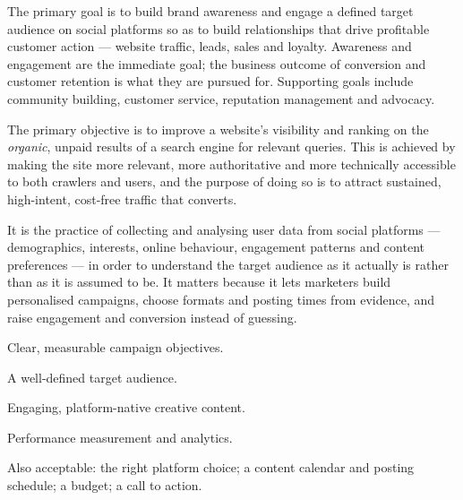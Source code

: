 \begin{qlist}

The primary goal is to build brand awareness and engage a defined target
audience on social platforms so as to build relationships that drive profitable
customer action --- website traffic, leads, sales and loyalty. Awareness and
engagement are the immediate goal; the business outcome of conversion and
customer retention is what they are pursued for. Supporting goals include
community building, customer service, reputation management and advocacy.

The primary objective is to improve a website's visibility and ranking on the
\emph{organic}, unpaid results of a search engine for relevant queries. This is
achieved by making the site more relevant, more authoritative and more
technically accessible to both crawlers and users, and the purpose of doing so
is to attract sustained, high-intent, cost-free traffic that converts.

It is the practice of collecting and analysing user data from social platforms
--- demographics, interests, online behaviour, engagement patterns and content
preferences --- in order to understand the target audience as it actually is
rather than as it is assumed to be. It matters because it lets marketers build
personalised campaigns, choose formats and posting times from evidence, and
raise engagement and conversion instead of guessing.

\begin{apts}
\item Clear, measurable campaign objectives.
\item A well-defined target audience.
\item Engaging, platform-native creative content.
\item Performance measurement and analytics.
\end{apts}
Also acceptable: the right platform choice; a content calendar and posting
schedule; a budget; a call to action.


\end{qlist}
